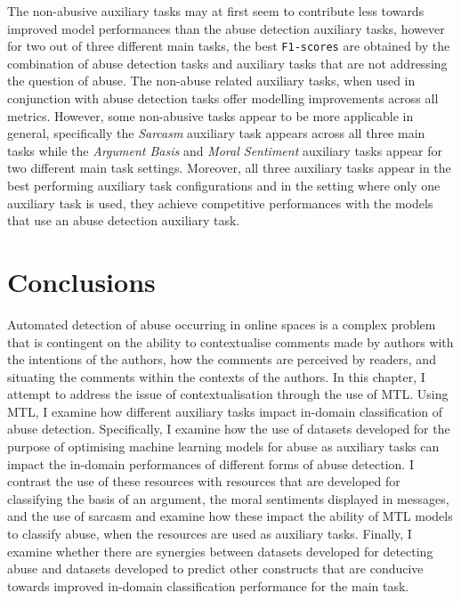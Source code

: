 The non-abusive auxiliary tasks may at first seem to contribute less towards improved model performances than the abuse detection auxiliary tasks, however for two out of three different main tasks, the best \texttt{F1-scores} are obtained by the combination of abuse detection tasks and auxiliary tasks that are not addressing the question of abuse.
The non-abuse related auxiliary tasks, when used in conjunction with abuse detection tasks offer modelling improvements across all metrics.
However, some non-abusive tasks appear to be more applicable in general, specifically the \textit{Sarcasm} auxiliary task appears across all three main tasks while the \textit{Argument Basis} and \textit{Moral Sentiment} auxiliary tasks appear for two different main task settings.
Moreover, all three auxiliary tasks appear in the best performing auxiliary task configurations and in the setting where only one auxiliary task is used, they achieve competitive performances with the models that use an abuse detection auxiliary task.

\section{Conclusions}

Automated detection of abuse occurring in online spaces is a complex problem that is contingent on the ability to contextualise comments made by authors with the intentions of the authors, how the comments are perceived by readers, and situating the comments within the contexts of the authors.
In this chapter, I attempt to address the issue of contextualisation through the use of MTL.
Using MTL, I examine how different auxiliary tasks impact in-domain classification of abuse detection.
Specifically, I examine how the use of datasets developed for the purpose of optimising machine learning models for abuse as auxiliary tasks can impact the in-domain performances of different forms of abuse detection.
I contrast the use of these resources with resources that are developed for classifying the basis of an argument, the moral sentiments displayed in messages, and the use of sarcasm and examine how these impact the ability of MTL models to classify abuse, when the resources are used as auxiliary tasks.
Finally, I examine whether there are synergies between datasets developed for detecting abuse and datasets developed to predict other constructs that are conducive towards improved in-domain classification performance for the main task.

